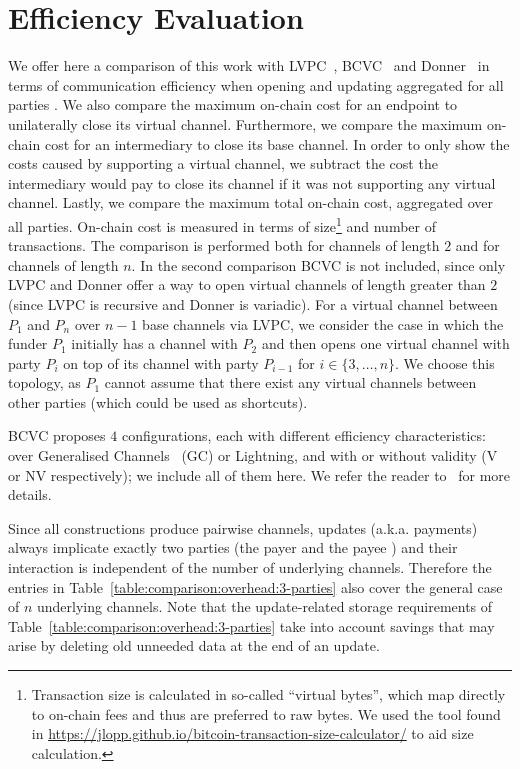 \section{Efficiency Evaluation}
  \label{section:comparison}
  We offer here a comparison of this work with
  LVPC~\cite{10.1007/978-3-030-65411-5_18}, BCVC~\cite{cryptoeprint:2020:554}
  and Donner~\cite{donner} in terms of communication efficiency when opening and
  updating aggregated for all parties . We also compare
  the maximum on-chain cost for an endpoint to unilaterally close its virtual
  channel. Furthermore, we compare the maximum on-chain cost for an intermediary
  to close its base channel. In order to only show the costs caused by
  supporting a virtual channel, we subtract the cost the intermediary would pay
  to close its channel if it was not supporting any virtual channel. Lastly, we
  compare the maximum total on-chain cost, aggregated over all parties. On-chain
  cost is measured in terms of size\footnote{Transaction size is calculated in
  so-called ``virtual bytes'', which map directly to on-chain fees and thus are
  preferred to raw bytes. We used the tool found in
  \url{https://jlopp.github.io/bitcoin-transaction-size-calculator/} to aid size
  calculation.} and number of transactions. The comparison is performed both for
  channels of length $2$ and for channels of length $n$. In the second
  comparison BCVC is not included, since only LVPC and Donner offer a way to
  open virtual channels of length greater than $2$ (since LVPC is recursive and
  Donner is variadic). For a virtual channel between $P_1$ and $P_n$ over $n-1$
  base channels via LVPC, we consider the case in which the funder $P_1$
  initially has a channel with $P_2$ and then opens one virtual channel with
  party $P_i$ on top of its channel with party $P_{i-1}$ for $i \in \{3, \dots,
  n\}$. We choose this topology, as $P_1$ cannot assume that there exist any
  virtual channels between other parties (which could be used as shortcuts).

  BCVC proposes $4$ configurations, each with different efficiency
  characteristics: over Generalised Channels~\cite{cryptoeprint:2020:476} (GC)
  or Lightning, and with or without validity (V or NV respectively); we include
  all of them here. We refer the reader to~\cite{cryptoeprint:2020:554} for more
  details.

  Since all constructions produce pairwise channels, updates (a.k.a. payments)
  always implicate exactly two parties (the payer and the payee ) and
  their interaction is independent of the number of underlying channels.
  Therefore the entries in Table~\ref{table:comparison:overhead:3-parties} also
  cover the general case of $n$ underlying channels. Note that the
  update-related storage requirements of
  Table~\ref{table:comparison:overhead:3-parties} take into account savings that
  may arise by deleting old unneeded data at the end of an update. 

